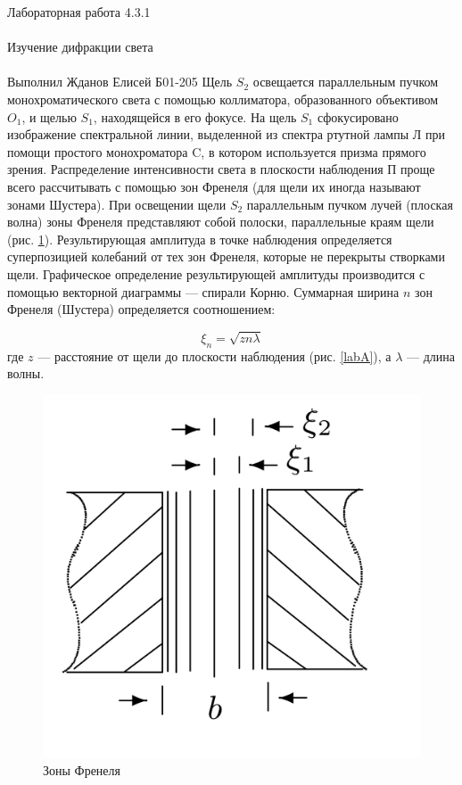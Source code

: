 \documentclass{astroedu-lab}
\begin{document}
\begin{problem}{\huge Лабораторная работа 4.3.1\\\\Изучение дифракции света\\\\Выполнил Жданов Елисей Б01-205}
Щель $ S_2 $ освещается параллельным пучком монохроматического света с помощью коллиматора, образованного объективом $ O_1 $, и щелью $S_1$, находящейся в его фокусе. На щель $ S_1 $ сфокусировано изображение спектральной линии, выделенной из спектра ртутной лампы Л при помощи простого монохроматора C, в котором используется призма прямого зрения. Распределение интенсивности света в плоскости наблюдения П проще всего рассчитывать с помощью зон Френеля (для щели их иногда называют зонами Шустера). При освещении щели $ S_2 $ параллельным пучком лучей (плоская волна) зоны Френеля представляют собой полоски, параллельные краям щели (рис. \ref{zone}). Результирующая амплитуда в точке наблюдения определяется суперпозицией колебаний от тех зон Френеля, которые не перекрыты створками щели. Графическое определение результирующей амплитуды производится с помощью векторной диаграммы --- спирали Корню. Суммарная ширина $ n $ зон Френеля (Шустера) определяется соотношением:

\begin{equation}\label{xin}
\xi_n = \sqrt{zn\lambda}
\end{equation}
где $ z $ --- расстояние от щели до плоскости наблюдения (рис. \ref{labA}), а $ \lambda $ --- длина волны.

\begin{figure}[H]
	\begin{center}
		\includegraphics[scale=0.15]{4.3.1/zone.jpeg}
	\end{center}
	\caption{Зоны Френеля}
	\label{zone}
\end{figure}


\end{problem}
\end{document}
